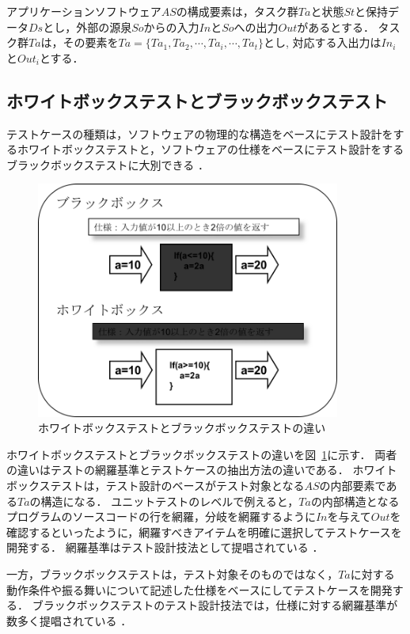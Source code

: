 アプリケーションソフトウェア$AS$の構成要素は，タスク群$Ta$と状態$St$と保持データ$Ds$とし，外部の源泉$So$からの入力$In$と$So$への出力$Out$があるとする．
タスク群$Ta$は，その要素を$Ta=\{Ta_1,Ta_2,\cdots,Ta_i,\cdots,Ta_t \}$とし, 対応する入出力は$In_i$と$Out_i$とする．
\subsection{ホワイトボックステストとブラックボックステスト}
テストケースの種類は，ソフトウェアの物理的な構造をベースにテスト設計をするホワイトボックステストと，ソフトウェアの仕様をベースにテスト設計をするブラックボックステストに大別できる\cite{myers2011art} ．

\begin{figure}[htbp]
  \begin{center}
  \includegraphics[width=10cm]{./image/D-2-BbWb.png}
  \caption{ホワイトボックステストとブラックボックステストの違い}
  \label{fig:D-2-BbWb}
  \end{center}
\end{figure}

ホワイトボックステストとブラックボックステストの違いを図~\ref{fig:D-2-BbWb}に示す．
両者の違いはテストの網羅基準とテストケースの抽出方法の違いである．
ホワイトボックステストは，テスト設計のベースがテスト対象となる$AS$の内部要素である$Ta$の構造になる．
ユニットテストのレベルで例えると，$Ta$の内部構造となるプログラムのソースコードの行を網羅，分岐を網羅するように$In$を与えて$Out$を確認するといったように，網羅すべきアイテムを明確に選択してテストケースを開発する．
網羅基準はテスト設計技法として提唱されている\cite{beiz90}
\cite{tj2005}
\cite{lewis2016software}
\cite{ammann2016introduction}
\cite{copeland2004practitioner}．

一方，ブラックボックステストは，テスト対象そのものではなく，$Ta$に対する動作条件や振る舞いについて記述した仕様をベースにしてテストケースを開発する．
ブラックボックステストのテスト設計技法では，仕様に対する網羅基準が数多く提唱されている\cite{jorgensen2016software}
\cite{binder2000testing}
\cite{kaner1999testing}
\cite{black2007pragmatic}
\cite{Ostrand:1988:CMS:62959.62964}
\cite{Grindal:2007:IPM:1332044.1332085}．

